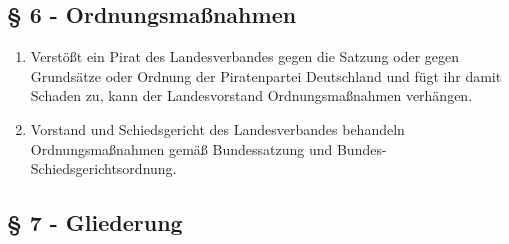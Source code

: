 \documentclass[draft,a4paper,10pt]{article}
\begin{document}
\subsection{§ 6 - Ordnungsmaßnahmen}
\begin{enumerate}
\item Verstößt ein Pirat des Landesverbandes gegen die Satzung oder gegen
Grundsätze oder Ordnung der Piratenpartei Deutschland und fügt ihr damit Schaden
zu, kann der Landesvorstand Ordnungsmaßnahmen verhängen.

\item Vorstand und Schiedsgericht des Landesverbandes behandeln
Ordnungsmaßnahmen gemäß Bundessatzung und Bundes-Schiedsgerichtsordnung.
\end{enumerate}

\subsection{§ 7 - Gliederung}
\end{document}
